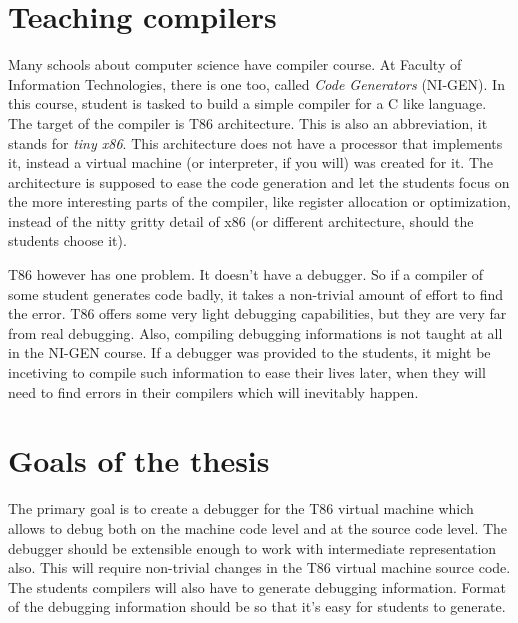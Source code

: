 \section{Teaching compilers}
Many schools about computer science have compiler course. At Faculty of Information Technologies, there is one too, called \textit{Code Generators} (NI-GEN). In this course, student is tasked to build a simple compiler for a C like language. The target of the compiler is T86 architecture. This is also an abbreviation, it stands for \textit{tiny x86}. This architecture does not have a processor that implements it, instead a virtual machine (or interpreter, if you will) was created for it. The architecture is supposed to ease the code generation and let the students focus on the more interesting parts of the compiler, like register allocation or optimization, instead of the nitty gritty detail of x86 (or different architecture, should the students choose it).

T86 however has one problem. It doesn't have a debugger. So if a compiler of some student generates code badly, it takes a non-trivial amount of effort to find the error. T86 offers some very light debugging capabilities, but they are very far from real debugging. Also, compiling debugging informations is not taught at all in the NI-GEN course. If a debugger was provided to the students, it might be incetiving to compile such information to ease their lives later, when they will need to find errors in their compilers which will inevitably happen.

\section{Goals of the thesis}
The primary goal is to create a debugger for the T86 virtual machine which allows to debug both on the machine code level and at the source code level. The debugger should be extensible enough to work with intermediate representation also. This will require non-trivial changes in the T86 virtual machine source code. The students compilers will also have to generate debugging information. Format of the debugging information should be so that it's easy for students to generate.

